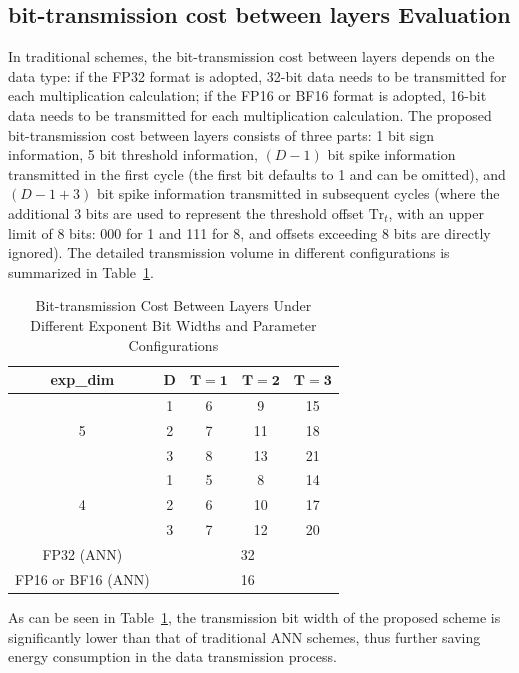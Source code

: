 \subsection{ bit-transmission cost between layers Evaluation}
 In traditional schemes, the  bit-transmission cost between layers depends on the data type: if the FP32 format is adopted, 32-bit data needs to be transmitted for each multiplication calculation; if the FP16 or BF16 format is adopted, 16-bit data needs to be transmitted for each multiplication calculation.
 The proposed  bit-transmission cost between layers consists of three parts: 1 bit sign information, 5 bit threshold information, $(D-1)$ bit spike information transmitted in the first cycle (the first bit defaults to 1 and can be omitted), and $(D-1+3)$ bit spike information transmitted in subsequent cycles (where the additional 3 bits are used to represent the threshold offset $\mathrm{Tr}_t$, with an upper limit of 8 bits: 000 for 1 and 111 for 8, and offsets exceeding 8 bits are directly ignored). The detailed transmission volume in different configurations is summarized in Table~\ref{tab:data_transmission}.
  \begin{table}[htbp]
    \centering
     \caption{ Bit-transmission Cost Between Layers Under Different Exponent Bit Widths and Parameter Configurations}
  \begin{tabular}{ccccc}
 
    \toprule
     \textbf{exp\_dim} & $\boldsymbol{D}$ & $\boldsymbol{T{=}1}$ & $\boldsymbol{T{=}2}$ & $\boldsymbol{T{=}3}$ \\
     \midrule
     \multirow{3}{*}{5} 
     & 1 & 6  & 9  & 15 \\
     & 2 & 7  & 11 & 18 \\
     & 3 & 8  & 13 & 21 \\
     \midrule
     \multirow{3}{*}{4} 
     & 1 & 5  & 8  & 14 \\
     & 2 & 6  & 10 & 17 \\
     & 3 & 7  & 12 & 20 \\
     \midrule
     FP32 (ANN)  & \multicolumn{4}{c}{32} \\
     FP16 or BF16 (ANN)  & \multicolumn{4}{c}{16} \\
     \bottomrule
   \end{tabular}
   
   \label{tab:data_transmission}
   \end{table}
 As can be seen in Table~\ref{tab:data_transmission}, the transmission bit width of the proposed scheme is significantly lower than that of traditional ANN schemes, thus further saving energy consumption in the data transmission process.

